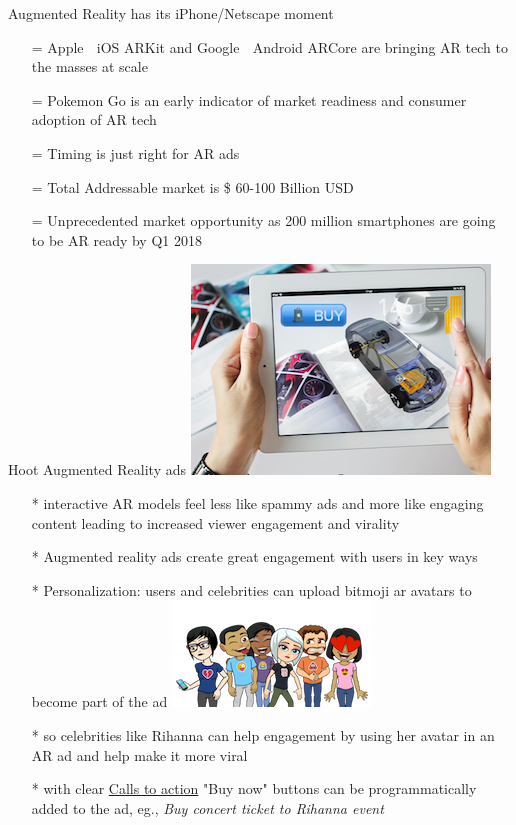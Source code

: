\documentclass[11pt]{beamer}
\begin{document}
\begin{frame}[t]{Augmented Reality has its iPhone/Netscape moment}
  \begin{itemize}[<+-| alert@+>]
	\item[=]Apple 🍎
	 iOS ARKit and Google 🤖 Android ARCore are bringing AR tech to the masses at scale
	\item[=]Pokemon Go is an early indicator of market readiness and consumer adoption of AR tech
	\item[=]Timing is just right for AR ads
	\item[=]Total Addressable market is \$ 60-100 Billion USD 
	\item[=]Unprecedented market opportunity as 200 million smartphones are going to be AR ready by Q1 2018
\end{itemize}
\end{frame}
\begin{frame}[t]{Hoot Augmented Reality ads \includegraphics[scale=.1]{static/arad/arad5}} 
  \begin{itemize}[<+-| alert@+>]
\item[*]interactive AR models feel  less like spammy ads and more like engaging content leading to increased viewer engagement and virality 
\item[*]Augmented reality ads create great engagement with users in key ways
\item[*]Personalization: users and celebrities can upload bitmoji ar avatars to become part of the ad
\includegraphics[scale=.15]{static/arad/bitmoji} 
\item[*]so celebrities like Rihanna can help engagement by using her avatar in an AR ad and help make it more viral 
\item[*]with clear \underline{Calls to action} "Buy now" buttons can be programmatically added to the ad, eg., \emph{ Buy concert ticket to Rihanna event}
\end{itemize}
\end{frame}
\end{document}
